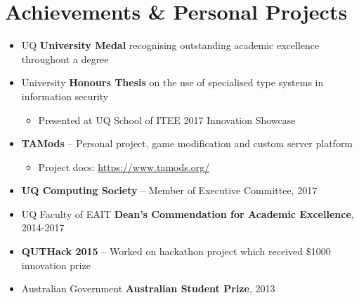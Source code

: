 \documentclass[11pt,a4paper,sans]{moderncv}        %
\begin{document}
\section{Achievements \& Personal Projects}
\begin{minipage}{\maincolumnwidth}\small
	\begin{itemize}
		\item UQ \textbf{University Medal} recognising outstanding academic excellence throughout a degree
		\item University \textbf{Honours Thesis} on the use of specialised type systems in information security
		\begin{itemize}
			\item Presented at UQ School of ITEE 2017 Innovation Showcase
		\end{itemize}
		\item \textbf{TAMods} -- Personal project, game modification and custom server platform
		\begin{itemize}
			\item Project docs: \href{https://www.tamods.org/}{https://www.tamods.org/}
		\end{itemize}
		\item \textbf{UQ Computing Society} -- Member of Executive Committee, 2017
		\item UQ Faculty of EAIT \textbf{Dean's Commendation for Academic Excellence}, 2014-2017
		\item \textbf{QUTHack 2015} -- Worked on hackathon project which received \$1000 innovation prize
		\item Australian Government \textbf{Australian Student Prize}, 2013
	\end{itemize}
\end{minipage}

\end{document}
